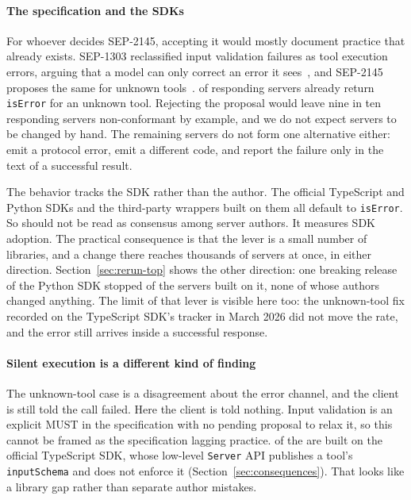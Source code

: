\paragraph{The specification and the SDKs}
For whoever decides SEP-2145, accepting it would mostly document practice that
already exists. SEP-1303 reclassified input validation failures as tool execution
errors, arguing that a model can only correct an error it sees~\cite{sep1303}, and
SEP-2145 proposes the same for unknown tools~\cite{sep2145}. \ErrAsResultRateCl{} of
responding servers already return \texttt{isError} for an unknown tool. Rejecting the
proposal would leave nine in ten responding servers non-conformant by example, and we
do not expect \ErrAsResultCount{} servers to be changed by hand. The remaining
servers do not form one alternative either: \UnknownProtoErrCount{} emit a protocol
error, \UnknownWrongCodeCount{} emit a different code, and \UnknownProseCount{} report
the failure only in the text of a successful result.

The behavior tracks the SDK rather than the author. The official TypeScript and
Python SDKs and the third-party wrappers built on them all default to
\texttt{isError}. So \ErrAsResultRateCl{} should not be read as consensus among server
authors. It measures SDK adoption. The practical consequence is that the lever is a
small number of libraries, and a change there reaches thousands of servers at once,
in either direction. Section~\ref{sec:rerun-top} shows the other direction: one breaking
release of the Python SDK stopped \PySDKLostRate{} of the servers built on it, none of
whose authors changed anything.
The limit of that lever is visible here too: the unknown-tool fix recorded on the
TypeScript SDK's tracker in March 2026 did not move the rate, and the error still
arrives inside a successful response.

\paragraph{Silent execution is a different kind of finding}
The unknown-tool case is a disagreement about the error channel, and the client is
still told the call failed. Here the client is told nothing. Input validation is an
explicit MUST in the specification with no pending proposal to relax it, so
this cannot be framed as the specification lagging practice. \SilentExecTS{} of the
\NSilentExec{} are built on the official TypeScript SDK, whose low-level
\texttt{Server} API publishes a tool's \texttt{inputSchema} and does not enforce it
(Section~\ref{sec:consequences}). That looks like a library gap rather than
\NSilentExec{} separate author mistakes.

